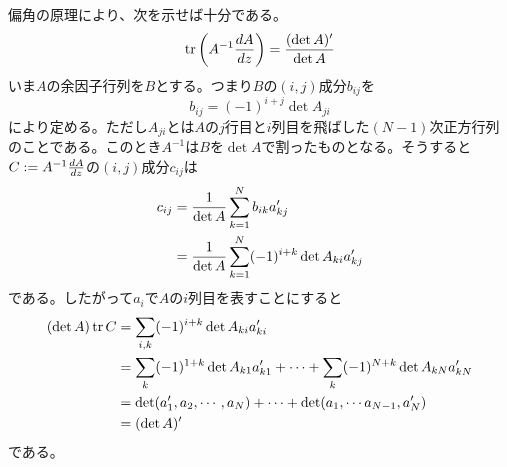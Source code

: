 \newpage



\subsubsection{} %
\begin{sol}
  偏角の原理により、次を示せば十分である。
  \[
  \operatorname{tr} \left(A^{-1} \frac{dA}{dz} \right) = \frac{(\det A)'}{\det A}
  \]
  いま$A$の余因子行列を$B$とする。つまり$B$の$(i,j)$成分$b_{ij}$を
  \[
  b_{ij} = (-1)^{i+j} \det A_{ji}
  \]
  により定める。ただし$A_{ji}$とは$A$の$j$行目と$i$列目を飛ばした$(N-1)$次正方行列のことである。このとき$A^{-1}$は$B$を$\det A$で割ったものとなる。そうすると$C := A^{-1} \frac{dA}{dz} $の$(i,j)$成分$c_{ij}$は
  \begin{align*}
    c_{ij} &= \frac{1}{\det A} \sum_{k=1}^N b_{ik} a'_{kj} \\
    &=  \frac{1}{\det A} \sum_{k=1}^N (-1)^{i+k} \det A_{ki} a'_{kj}
  \end{align*}
  である。したがって$a_i$で$A$の$i$列目を表すことにすると
\begin{align*}
  (\det A) \operatorname{tr} C &= \sum_{i,k} (-1)^{i+k} \det A_{ki} a'_{ki} \\
  &= \sum_{k} (-1)^{1+k} \det A_{k1} a'_{k1} + \cdots + \sum_{k} (-1)^{N+k} \det A_{kN} a'_{kN} \\
  &= \det(a_1', a_2, \cdots , a_N) + \cdots + \det(a_1, \cdots a_{N-1} , a'_N) \\
  &= (\det A)'
\end{align*}
である。
\end{sol}
